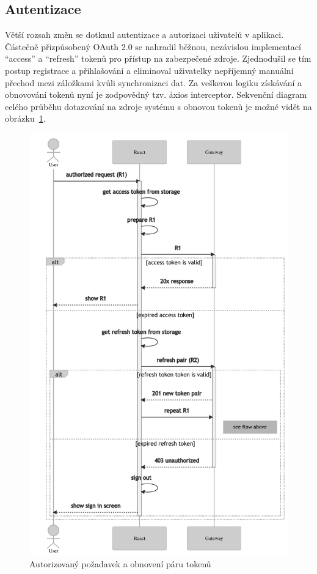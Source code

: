 \subsection{Autentizace}\label{subsec:client-auth}

Větší rozsah změn se dotknul autentizace a autorizaci uživatelů v aplikaci.
Částečně přizpůsobený OAuth 2.0 se nahradil běžnou, nezávislou implementací \enquote{access} a \enquote{refresh} tokenů pro přístup na zabezpečené zdroje.
Zjednodušil se tím postup registrace a přihlašování a eliminoval uživatelky nepříjemný manuální přechod mezi záložkami kvůli synchronizaci dat.
Za veškerou logiku získávání a obnovování tokenů nyní je zodpovědný tzv. \h{axios interceptor}.
Sekvenční diagram celého průběhu dotazování na zdroje systému s obnovou tokenů je možné vidět na obrázku~\ref{fig:cli-tokens}.


\begin{figure}[htbp]
   \centering
   \includegraphics[max width=\textwidth]{assets/dia-seq-tokens-bw}
   \caption{Autorizovaný požadavek a obnovení páru tokenů}\label{fig:cli-tokens}
\end{figure}



